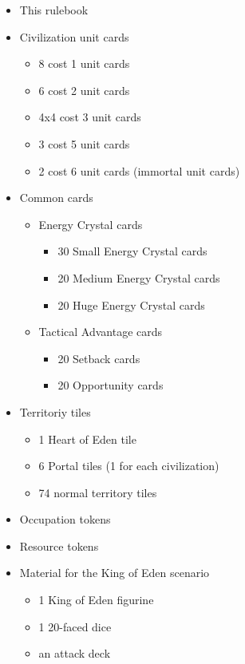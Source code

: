 \documentclass[a4paper]{article}
\begin{document}
    \begin{itemize}
        \item This rulebook
        \item Civilization unit cards
            \begin{itemize}
                \item 8 cost 1 unit cards
                \item 6 cost 2 unit cards
                \item 4x4 cost 3 unit cards
                \item 3 cost 5 unit cards
                \item 2 cost 6 unit cards (immortal unit cards)
            \end{itemize}
        \item Common cards
            \begin{itemize}
                \item Energy Crystal cards
                    \begin{itemize}
                        \item 30 Small Energy Crystal cards
                        \item 20 Medium Energy Crystal cards
                        \item 20 Huge Energy Crystal cards
                    \end{itemize}
                \item Tactical Advantage cards
                    \begin{itemize}
                        \item 20 Setback cards
                        \item 20 Opportunity cards
                    \end{itemize}
            \end{itemize}
\newpage
        \item Territoriy tiles
            \begin{itemize}
                \item 1 Heart of Eden tile
                \item 6 Portal tiles (1 for each civilization)
                \item 74 normal territory tiles
            \end{itemize}
        \item Occupation tokens
        \item Resource tokens
        \item Material for the King of Eden scenario
            \begin{itemize}
                \item 1 King of Eden figurine
                \item 1 20-faced dice
                \item an attack deck
            \end{itemize}
    \end{itemize}
\end{document}
